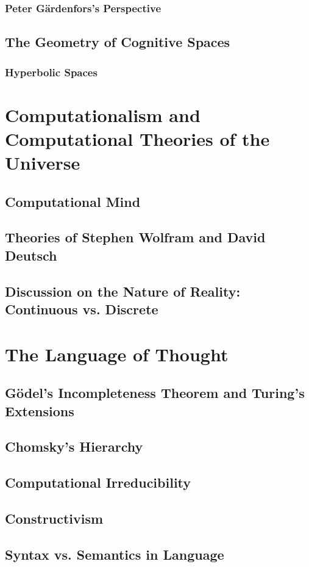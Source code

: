 \documentclass[twocolumn]{article}
\begin{document}
\subsubsection{Peter Gärdenfors's Perspective}
\subsection{The Geometry of Cognitive Spaces}
\subsubsection{Hyperbolic Spaces}

\section{Computationalism and Computational Theories of the Universe}
\subsection{Computational Mind}
\subsection{Theories of Stephen Wolfram and David Deutsch}
\subsection{Discussion on the Nature of Reality: Continuous vs. Discrete}

\section{The Language of Thought}
\subsection{Gödel's Incompleteness Theorem and Turing's Extensions}
\subsection{Chomsky's Hierarchy}
\subsection{Computational Irreducibility}
\subsection{Constructivism}
\subsection{Syntax vs. Semantics in Language}
\end{document}
